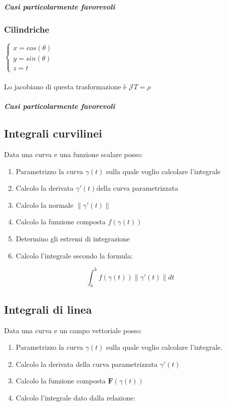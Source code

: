 \documentclass[10pt,a4paper]{report}
\newcommand{\norm}[1]{ \left\lVert {#1} \right\rVert}
\begin{document}
				\subparagraph{Casi particolarmente favorevoli}
			\subsubsection{Cilindriche}
			$ \begin{cases} 
			x=cos(\theta) \\ 
			y=sin(\theta) \\
			z=t
			\end{cases} $
			\\ \\
			Lo jacobiano di questa trasformazione è $\mathcal{J}T=\rho $
			
				\subparagraph{Casi particolarmente favorevoli}
		

		\subsection*{Integrali \textbf{curvilinei}}
			Data una curva e una funzione scalare posso:
			\begin{enumerate}
				\item Parametrizzo la curva $ \gamma(t) $ sulla quale voglio calcolare l'integrale
				\item Calcolo la derivata $ \gamma ' (t) $della curva parametrizzata
                \item Calcolo la normale $ \norm{\gamma '(t)} $
				\item Calcolo la funzione composta $ f(\gamma (t)) $
				\item Determino gli estremi di integrazione
				\item Calcolo l'integrale secondo la formula:
			\end{enumerate}
		
		\[ \int_{a}^{b} f(\gamma (t)) \norm{\gamma '(t)} dt\]
		
		
		\subsection*{Integrali di \textbf{linea}}
		Data una curva e un campo vettoriale posso:
			\begin{enumerate}
				\item Parametrizzo la curva $ \gamma(t) $ sulla quale voglio calcolare l'integrale. 
				\item Calcolo la derivata della curva parametrizzata $ \gamma ' (t) $ 
				\item Calcolo la funzione composta $ \mathbf{F}(\gamma (t)) $
				\item Calcolo l'integrale dato dalla relazione:
				\end{enumerate}
			
\end{document}
